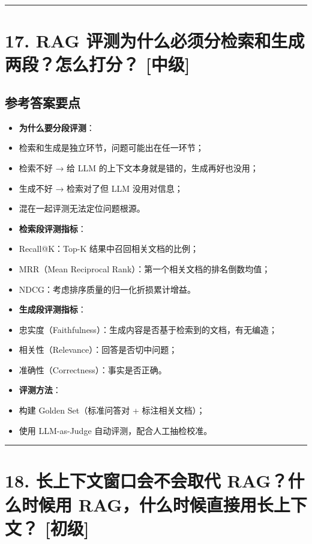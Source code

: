 \documentclass[9pt,a4paper,twocolumn]{ctexart}
\newcommand{\lvchu}{\usebox{\badgechubox}}
\newcommand{\lvzhong}{\usebox{\badgezhongbox}}
\def\lvchu{[初级]}%
\def\lvzhong{[中级]}%
\begin{document}
\vspace{2pt}
\noindent\rule{\columnwidth}{0.3pt}\vspace{2pt}



\section*{17. RAG 评测为什么必须分检索和生成两段？怎么打分？ \lvzhong{}}


\subsection*{参考答案要点}

\begin{itemize}[itemsep=1pt, topsep=2pt]
  \item \textbf{为什么要分段评测}：
  \item 检索和生成是独立环节，问题可能出在任一环节；
  \item 检索不好 → 给 LLM 的上下文本身就是错的，生成再好也没用；
  \item 生成不好 → 检索对了但 LLM 没用对信息；
  \item 混在一起评测无法定位问题根源。
  \item \textbf{检索段评测指标}：
  \item Recall@K：Top-K 结果中召回相关文档的比例；
  \item MRR（Mean Reciprocal Rank）：第一个相关文档的排名倒数均值；
  \item NDCG：考虑排序质量的归一化折损累计增益。
  \item \textbf{生成段评测指标}：
  \item 忠实度（Faithfulness）：生成内容是否基于检索到的文档，有无编造；
  \item 相关性（Relevance）：回答是否切中问题；
  \item 准确性（Correctness）：事实是否正确。
  \item \textbf{评测方法}：
  \item 构建 Golden Set（标准问答对 + 标注相关文档）；
  \item 使用 LLM-as-Judge 自动评测，配合人工抽检校准。
\end{itemize}


\vspace{2pt}
\noindent\rule{\columnwidth}{0.3pt}\vspace{2pt}



\section*{18. 长上下文窗口会不会取代 RAG？什么时候用 RAG，什么时候直接用长上下文？ \lvchu{}}
\end{document}
